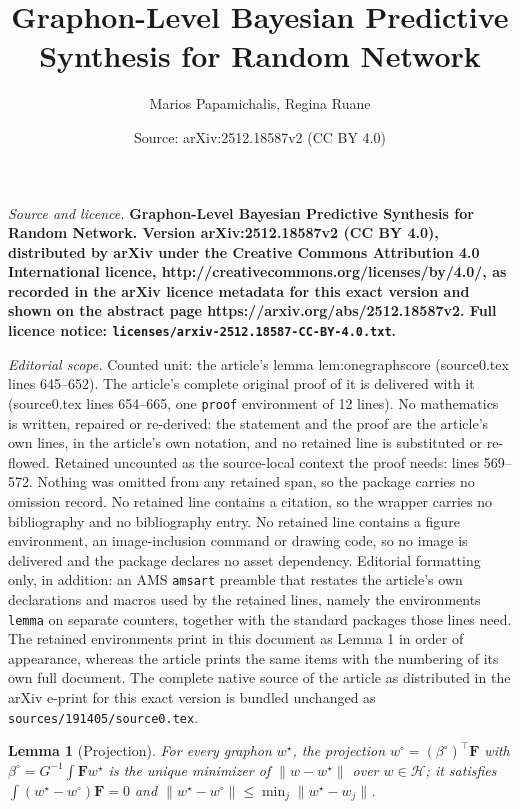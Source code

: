 \documentclass[10pt,a4paper]{amsart}
\title{\bf Graphon-Level Bayesian Predictive Synthesis for Random Network}
\author{Marios Papamichalis, Regina Ruane}
\date{Source: arXiv:2512.18587v2 (CC BY 4.0)}
\newtheorem{lemma}{Lemma}
\newcommand{\Fv}{\mathbf{F}}
\newcommand{\bproj}{\beta^{\circ}}
\newcommand{\calH}{\mathcal{H}}
\newcommand{\norm}[1]{\|#1\|}
\newcommand{\wproj}{w^{\circ}}
\newcommand{\wstar}{w^{\star}}
\begin{document}
\maketitle

\noindent\emph{Source and licence.} \bf Graphon-Level Bayesian Predictive Synthesis for Random Network. Version arXiv:2512.18587v2 (CC BY 4.0), distributed by arXiv under the Creative Commons Attribution 4.0 International licence, http://creativecommons.org/licenses/by/4.0/, as recorded in the arXiv licence metadata for this exact version and shown on the abstract page https://arxiv.org/abs/2512.18587v2. Full licence notice: \texttt{licenses/arxiv-2512.18587-CC-BY-4.0.txt}.\par\smallskip

\noindent\textit{Editorial scope.} Counted unit: the article's lemma lem:onegraphscore (source0.tex lines 645--652). The article's complete original proof of it is delivered with it (source0.tex lines 654--665, one \texttt{proof} environment of 12 lines). No mathematics is written, repaired or re-derived: the statement and the proof are the article's own lines, in the article's own notation, and no retained line is substituted or re-flowed.  Retained uncounted as the source-local context the proof needs: lines 569--572.  Nothing was omitted from any retained span, so the package carries no omission record.  No retained line contains a citation, so the wrapper carries no bibliography and no bibliography entry.  No retained line contains a figure environment, an image-inclusion command or drawing code, so no image is delivered and the package declares no asset dependency.  Editorial formatting only, in addition: an AMS \texttt{amsart} preamble that restates the article's own declarations and macros used by the retained lines, namely the environments \texttt{lemma} on separate counters, together with the standard packages those lines need.  The retained environments print in this document as Lemma 1 in order of appearance, whereas the article prints the same items with the numbering of its own full document.  The complete native source of the article as distributed in the arXiv e-print for this exact version is bundled unchanged as \texttt{sources/191405/source0.tex}.
\begin{lemma}[Projection]
\label{lem:proj}
For every graphon $\wstar$, the projection $\wproj=(\bproj)^{\top}\Fv$ with $\bproj=G^{-1}\int\Fv\wstar$ is the unique minimizer of $\norm{w-\wstar}$ over $w\in\calH$; it satisfies $\int(\wstar-\wproj)\Fv=0$ and $\norm{\wstar-\wproj}\le\min_j\norm{\wstar-w_j}$.
\end{lemma}
\end{document}
